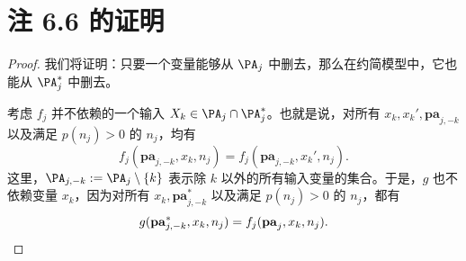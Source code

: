 \section{注 6.6 的证明}
\begin{proof}
我们将证明：只要一个变量能够从 $\PA_j$ 中删去，那么在约简模型中，它也能从 $\PA_j^*$ 中删去。

考虑 $f_j$ 并不依赖的一个输入 $X_k\in\PA_j\cap\PA_j^*$。也就是说，对所有 $x_k,x_k',\mathbf{pa}_{j,-k}$ 以及满足 $p(n_j)>0$ 的 $n_j$，均有
\[f_j(\mathbf{pa}_{j,-k},x_k,n_j)=f_j(\mathbf{pa}_{j,-k},x_k',n_j).\]
这里，$\PA_{j,-k}:=\PA_j\setminus\{k\}$ 表示除 $k$ 以外的所有输入变量的集合。于是，$g$ 也不依赖变量 $x_k$，因为对所有 $x_k,\mathbf{pa}_{j,-k}^*$ 以及满足 $p(n_j)>0$ 的 $n_j$，都有
\[g(\mathbf{pa}_{j,-k}^*,x_k,n_j)=f_j(\mathbf{pa}_j,x_k,n_j).\qedhere\]
\end{proof}

